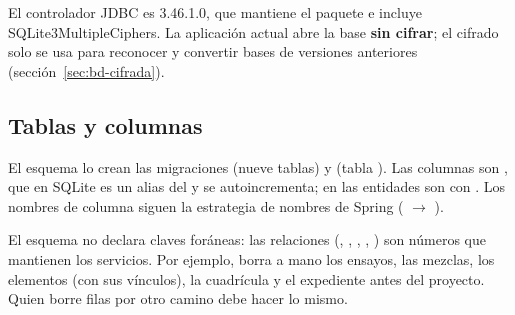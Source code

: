 El controlador JDBC es  3.46.1.0, que mantiene el paquete 
e incluye SQLite3MultipleCiphers. La aplicación actual abre la base \textbf{sin cifrar}; el cifrado solo se usa para
reconocer y convertir bases de versiones anteriores (sección~\ref{sec:bd-cifrada}).

\subsection{Tablas y columnas}

El esquema lo crean las migraciones  (nueve tablas) y  (tabla
). Las columnas  son , que en SQLite es un alias del  y se
autoincrementa; en las entidades son  con . Los nombres de columna siguen la
estrategia de nombres de Spring ( $\rightarrow$ ).

\begin{importante}
El esquema no declara claves foráneas: las relaciones (, , ,
, ) son números que mantienen los servicios. Por ejemplo,
 borra a mano los ensayos, las mezclas, los elementos (con sus
vínculos), la cuadrícula y el expediente antes del proyecto. Quien borre filas por otro camino debe hacer lo mismo.
\end{importante}

